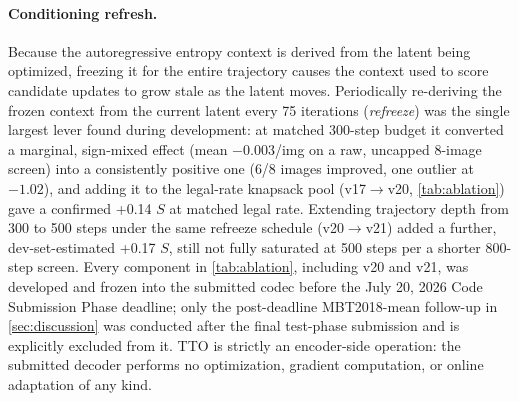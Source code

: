 \documentclass[runningheads]{llncs}
\begin{document}
\paragraph{Conditioning refresh.} Because the autoregressive entropy context is derived from the latent being optimized, freezing it for the entire trajectory causes the context used to score candidate updates to grow stale as the latent moves. Periodically re-deriving the frozen context from the current latent every 75 iterations (\emph{refreeze}) was the single largest lever found during development: at matched 300-step budget it converted a marginal, sign-mixed effect (mean $-0.003$/img on a raw, uncapped 8-image screen) into a consistently positive one (6/8 images improved, one outlier at $-1.02$), and adding it to the legal-rate knapsack pool (v17$\to$v20, \cref{tab:ablation}) gave a confirmed +0.14 $S$ at matched legal rate. Extending trajectory depth from 300 to 500 steps under the same refreeze schedule (v20$\to$v21) added a further, dev-set-estimated +0.17 $S$, still not fully saturated at 500 steps per a shorter 800-step screen. Every component in \cref{tab:ablation}, including v20 and v21, was developed and frozen into the submitted codec before the July 20, 2026 Code Submission Phase deadline; only the post-deadline MBT2018-mean follow-up in \cref{sec:discussion} was conducted after the final test-phase submission and is explicitly excluded from it. TTO is strictly an encoder-side operation: the submitted decoder performs no optimization, gradient computation, or online adaptation of any kind.
\end{document}
